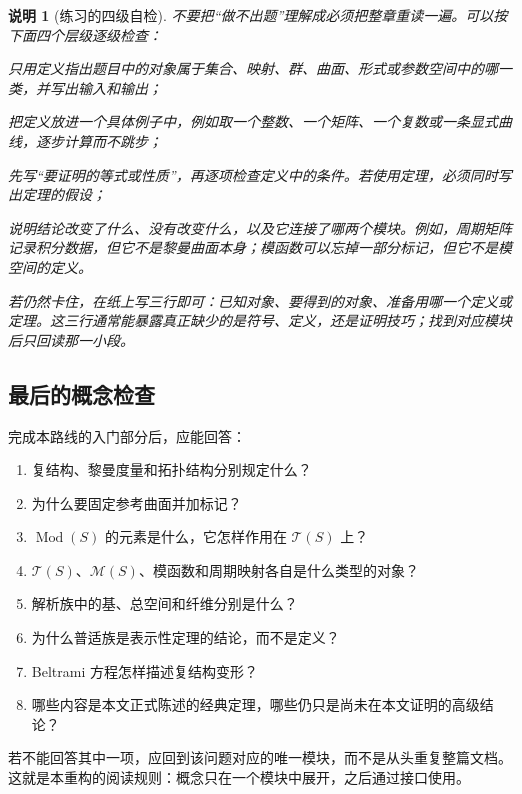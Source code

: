 \documentclass[UTF8,fontset=none,a4paper,11pt]{ctexart}
\theoremstyle{foundation-definition}
\theoremstyle{foundation-theorem}
\theoremstyle{foundation-proposition}
\theoremstyle{foundation-example}
\theoremstyle{foundation-remark}
\newtheorem{remark}[definition]{说明}
\theoremstyle{foundation-theorem}
\newcommand{\T}{\mathcal T}
\newcommand{\M}{\mathcal M}
\newcommand{\Mod}{\operatorname{Mod}}
\begin{document}
\begin{remark}[练习的四级自检]
不要把“做不出题”理解成必须把整章重读一遍。可以按下面四个层级逐级检查：
\begin{description}[style=nextline,leftmargin=2.8cm]
  \item[一级：认对象] 只用定义指出题目中的对象属于集合、映射、群、曲面、形式或参数空间中的哪一类，并写出输入和输出；
  \item[二级：代入算] 把定义放进一个具体例子中，例如取一个整数、一个矩阵、一个复数或一条显式曲线，逐步计算而不跳步；
  \item[三级：按定义证] 先写“要证明的等式或性质”，再逐项检查定义中的条件。若使用定理，必须同时写出定理的假设；
  \item[四级：辨接口] 说明结论改变了什么、没有改变什么，以及它连接了哪两个模块。例如，周期矩阵记录积分数据，但它不是黎曼曲面本身；模函数可以忘掉一部分标记，但它不是模空间的定义。
\end{description}
若仍然卡住，在纸上写三行即可：\emph{已知对象}、\emph{要得到的对象}、\emph{准备用哪一个定义或定理}。这三行通常能暴露真正缺少的是符号、定义，还是证明技巧；找到对应模块后只回读那一小段。
\end{remark}

\subsection{最后的概念检查}

完成本路线的入门部分后，应能回答：

\begin{enumerate}[label=(\arabic*)]
  \item 复结构、黎曼度量和拓扑结构分别规定什么？
  \item 为什么要固定参考曲面并加标记？
  \item \(\Mod(S)\) 的元素是什么，它怎样作用在 \(\T(S)\) 上？
  \item \(\T(S)\)、\(\M(S)\)、模函数和周期映射各自是什么类型的对象？
  \item 解析族中的基、总空间和纤维分别是什么？
  \item 为什么普适族是表示性定理的结论，而不是定义？
  \item Beltrami 方程怎样描述复结构变形？
  \item 哪些内容是本文正式陈述的经典定理，哪些仍只是尚未在本文证明的高级结论？
\end{enumerate}

若不能回答其中一项，应回到该问题对应的唯一模块，而不是从头重复整篇文档。这就是本重构的阅读规则：概念只在一个模块中展开，之后通过接口使用。
\end{document}
